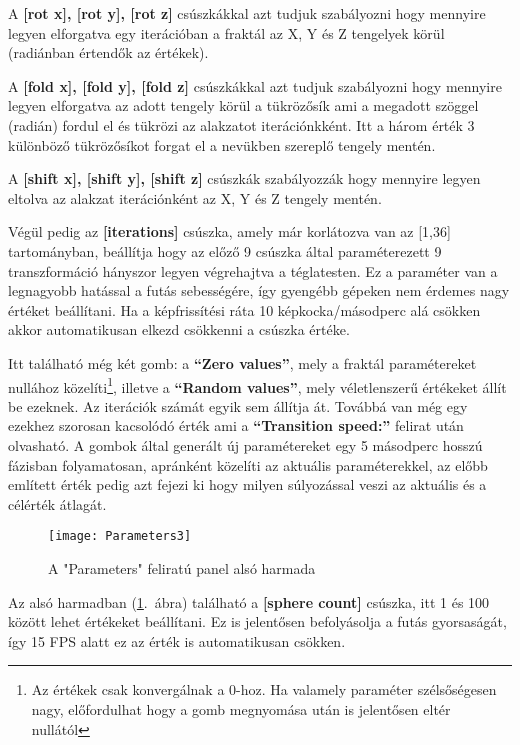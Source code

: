 A \textbf{[rot x], [rot y], [rot z]} csúszkákkal azt tudjuk szabályozni hogy mennyire legyen elforgatva egy iterációban a fraktál az X, Y és Z tengelyek körül (radiánban értendők az értékek). 

A \textbf{[fold x], [fold y], [fold z]} csúszkákkal azt tudjuk szabályozni hogy mennyire legyen elforgatva az adott tengely körül a tükrözősík  ami a megadott szöggel (radián) fordul el és tükrözi az alakzatot iterációnkként. Itt a három érték 3 különböző tükrözősíkot forgat el a nevükben szereplő tengely mentén. 

A \textbf{[shift x], [shift y], [shift z]} csúszkák szabályozzák hogy mennyire legyen eltolva az alakzat iterációnként az X, Y és Z tengely mentén.

Végül pedig az \textbf{[iterations]} csúszka, amely már korlátozva van az [1,36] tartományban, beállítja hogy az előző 9 csúszka által paraméterezett 9 transzformáció hányszor legyen végrehajtva a téglatesten. Ez a paraméter van a legnagyobb hatással a futás sebességére, így gyengébb gépeken nem érdemes nagy értéket beállítani. Ha a képfrissítési ráta 10 képkocka/másodperc alá csökken akkor automatikusan elkezd csökkenni a csúszka értéke.

Itt található még két gomb: a \textbf{``Zero values''}, mely a fraktál paramétereket nullához közelíti\footnote{Az értékek csak konvergálnak a 0-hoz. Ha valamely paraméter szélsőségesen nagy, előfordulhat hogy a gomb megnyomása után is jelentősen eltér nullától}, illetve a \textbf{``Random values''}, mely véletlenszerű értékeket állít be ezeknek. Az iterációk számát egyik sem állítja át. Továbbá van még egy ezekhez szorosan kacsolódó érték ami a \textbf{``Transition speed:''} felirat után olvasható. A gombok által generált új paramétereket egy 5 másodperc hosszú fázisban folyamatosan, apránként közelíti az aktuális paraméterekkel, az előbb említett érték pedig azt fejezi ki hogy milyen súlyozással veszi az aktuális és a célérték átlagát.

\begin{figure}[H]
	\centering
	\texttt{[image: Parameters3]}
	\caption{A "Parameters" feliratú panel alsó harmada}
	\label{fig:Parameters3}
\end{figure}

Az alsó harmadban (\ref{fig:Parameters3}.~ábra) található a \textbf{[sphere count]} csúszka, itt 1 és 100 között lehet értékeket beállítani. Ez is jelentősen befolyásolja a futás gyorsaságát, így 15 FPS alatt ez az érték is automatikusan csökken.

